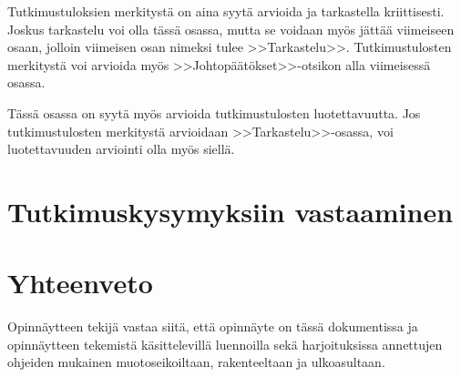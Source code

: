 \documentclass[finnish,12pt,a4paper,pdftex]{article}
\begin{document}
Tutkimustuloksien merkitystä on aina syytä arvioida ja tarkastella
kriittisesti.  Joskus tarkastelu voi olla tässä osassa, mutta se
voidaan myös jättää viimeiseen osaan, jolloin viimeisen osan nimeksi
tulee >>Tarkastelu>>. Tutkimustulosten merkitystä voi arvioida myös
>>Johtopäätökset>>-otsikon alla viimeisessä osassa. 

Tässä osassa on syytä myös arvioida tutkimustulosten luotettavuutta.
Jos tutkimustulosten merkitystä arvioidaan >>Tarkastelu>>-osassa,
voi luotettavuuden arviointi olla myös siellä. 

\clearpage

\section{Tutkimuskysymyksiin vastaaminen}

\section{Yhteenveto}

Opinnäytteen tekijä vastaa siitä, että opinnäyte on tässä dokumentissa
ja opinnäytteen tekemistä käsittelevillä luennoilla sekä
harjoituksissa annettujen ohjeiden mukainen muotoseikoiltaan,
rakenteeltaan ja ulkoasultaan.



\clearpage




\end{document}
